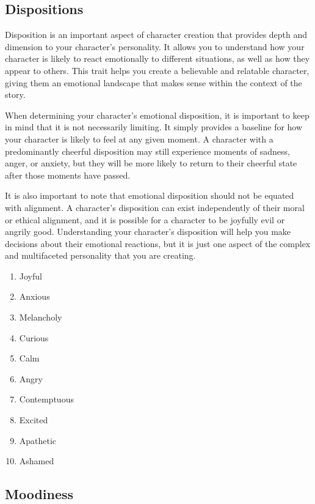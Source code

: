 \documentclass[12pt]{book}
\begin{document}
\subsection{\textbf{Dispositions}}

Disposition is an important aspect of character creation that provides depth and dimension to your character's personality. It allows you to understand how your character is likely to react emotionally to different situations, as well as how they appear to others. This trait helps you create a believable and relatable character, giving them an emotional landscape that makes sense within the context of the story.

When determining your character's emotional disposition, it is important to keep in mind that it is not necessarily limiting. It simply provides a baseline for how your character is likely to feel at any given moment. A character with a predominantly cheerful disposition may still experience moments of sadness, anger, or anxiety, but they will be more likely to return to their cheerful state after those moments have passed.

It is also important to note that emotional disposition should not be equated with alignment. A character's disposition can exist independently of their moral or ethical alignment, and it is possible for a character to be joyfully evil or angrily good. Understanding your character's disposition will help you make decisions about their emotional reactions, but it is just one aspect of the complex and multifaceted personality that you are creating.

\begin{enumerate}
    \item Joyful
    \item Anxious
    \item Melancholy
    \item Curious
    \item Calm
    \item Angry
    \item Contemptuous
    \item Excited
    \item Apathetic
    \item Ashamed
\end{enumerate}

\subsection{\textbf{Moodiness}}
\end{document}
